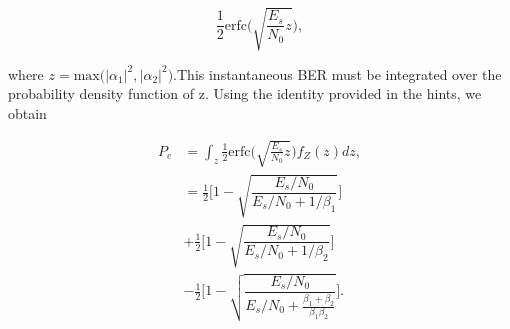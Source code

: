 \documentclass [a4paper, 11pt] {article}
\begin{document}
\begin{solution}
\begin{enumerate}
\begin{equation}\frac{1}{2}\text{erfc}\Bigg(\sqrt{\frac{E_s}{N_0}z} \Bigg),
\end{equation}

where $z = \text{max}\big(|\alpha_1|^2,|\alpha_2|^2\big)$.This instantaneous BER must be integrated over the probability density function of z. Using the identity provided in the hints, we obtain 

\begin{align}
    P_e &= \int_{z}\frac{1}{2}\text{erfc}\Bigg(\sqrt{\frac{E_s}{N_0}z}\Bigg)f_Z(z) dz,\\
    &= \frac{1}{2} \Bigg[1-\sqrt{\dfrac{E_s/N_0}{E_s/N_0+ 1/\beta_1}}\Bigg]\\
    &+ \frac{1}{2} \Bigg[1-\sqrt{\dfrac{E_s/N_0}{E_s/N_0+ 1/\beta_2}}\Bigg] \nonumber\\
    &- \frac{1}{2} \Bigg[1-\sqrt{\dfrac{E_s/N_0}{E_s/N_0+\frac{\beta_1 + \beta_2}{\beta_1\beta_2}}}\Bigg].\nonumber
\end{align}



\end{enumerate}

    \end{solution}
    
        
   
\end{document}
